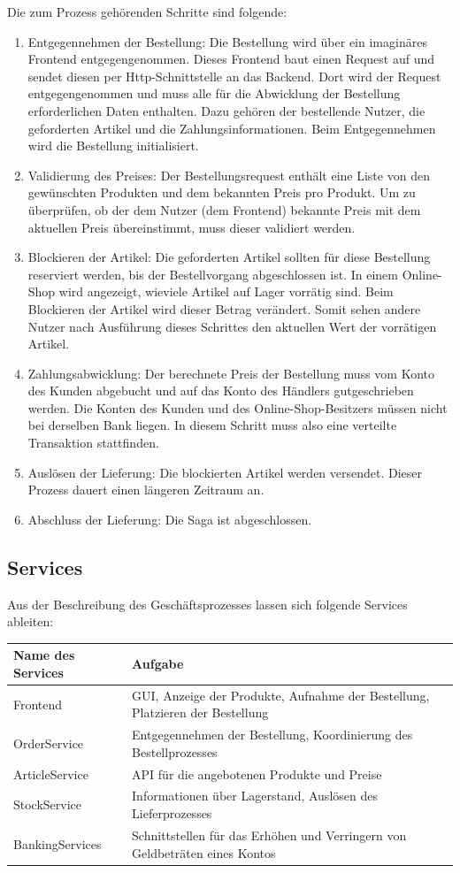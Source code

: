 Die zum Prozess gehörenden Schritte sind folgende:
\begin{enumerate}
	\item Entgegennehmen der Bestellung: Die Bestellung wird über ein imaginäres Frontend entgegengenommen. Dieses Frontend baut einen Request auf und sendet diesen per Http-Schnittstelle an das Backend. Dort wird der Request entgegengenommen und muss alle für die Abwicklung der Bestellung erforderlichen Daten enthalten. Dazu gehören der bestellende Nutzer, die geforderten Artikel und die Zahlungsinformationen. Beim Entgegennehmen wird die Bestellung initialisiert.
	\item Validierung des Preises: Der Bestellungsrequest enthält eine Liste von den gewünschten Produkten und dem bekannten Preis pro Produkt. Um zu überprüfen, ob der dem Nutzer (dem Frontend) bekannte Preis mit dem aktuellen Preis übereinstimmt, muss dieser validiert werden. %
	\item Blockieren der Artikel: Die geforderten Artikel sollten für diese Bestellung reserviert werden, bis der Bestellvorgang abgeschlossen ist. In einem Online-Shop wird angezeigt, wieviele Artikel auf Lager vorrätig sind. Beim Blockieren der Artikel wird dieser Betrag verändert. Somit sehen andere Nutzer nach Ausführung dieses Schrittes den aktuellen Wert der vorrätigen Artikel. 
	\item Zahlungsabwicklung: Der berechnete Preis der Bestellung muss vom Konto des Kunden abgebucht und auf das Konto des Händlers gutgeschrieben werden. Die Konten des Kunden und des Online-Shop-Besitzers müssen nicht bei derselben Bank liegen. In diesem Schritt muss also eine verteilte Transaktion stattfinden.
	\item Auslösen der Lieferung: Die blockierten Artikel werden versendet. Dieser Prozess dauert einen längeren Zeitraum an.
	\item Abschluss der Lieferung: Die Saga ist abgeschlossen.
\end{enumerate}

\subsection{Services}
Aus der Beschreibung des Geschäftsprozesses lassen sich folgende Services ableiten:

\begin{tabular}[h]{|l|l|}
	\hline
	Name des Services & Aufgabe \\ \hline
	Frontend & GUI, Anzeige der Produkte, Aufnahme der Bestellung, Platzieren der Bestellung \\ \hline
	OrderService & Entgegennehmen der Bestellung, Koordinierung des Bestellprozesses \\ \hline
	ArticleService & API für die angebotenen Produkte und Preise \\ \hline
	StockService & Informationen über Lagerstand, Auslösen des Lieferprozesses \\ \hline
	BankingServices & Schnittstellen für das Erhöhen und Verringern von Geldbeträten eines Kontos \\ \hline
\end{tabular}

